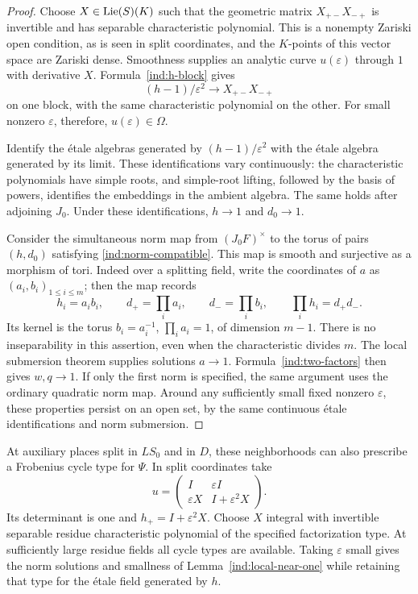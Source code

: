 \begin{proof}
Choose $X\in\operatorname{Lie}(S)(K)$ such that the geometric matrix
$X_{+-}X_{-+}$ is invertible and has separable characteristic polynomial.
This is a nonempty Zariski open condition, as is seen in split
coordinates, and the $K$-points of this vector space are Zariski dense.
Smoothness supplies an analytic curve $u(\varepsilon)$ through $1$ with
derivative $X$.  Formula~\eqref{ind:h-block} gives
\[
                    (h-1)/\varepsilon^2
                       \longrightarrow X_{+-}X_{-+}
\]
on one block, with the same characteristic polynomial on the other.
For small nonzero $\varepsilon$, therefore, $u(\varepsilon)\in\Omega$.

Identify the \'etale algebras generated by $(h-1)/\varepsilon^2$ with
the \'etale algebra generated by its limit.  These identifications vary
continuously: the characteristic polynomials have simple roots, and
simple-root lifting, followed by the basis of powers, identifies the
embeddings in the ambient algebra.  The same holds after adjoining
$J_0$.  Under these identifications, $h\to1$ and $d_0\to1$.

Consider the simultaneous norm map from $(J_0F)^\times$ to the torus of
pairs $(h,d_0)$ satisfying \eqref{ind:norm-compatible}.  This map is
smooth and surjective as a morphism of tori.  Indeed over a splitting
field, write the coordinates of $a$ as $(a_i,b_i)_{1\leq i\leq m}$;
then the map records
\[
           h_i=a_i b_i,\qquad d_+=\prod_i a_i,\qquad
           d_-=\prod_i b_i,\qquad \prod_i h_i=d_+d_-.
\]
Its kernel is the torus $b_i=a_i^{-1}$, $\prod_i a_i=1$, of dimension
$m-1$.  There is no inseparability in this assertion, even when the
characteristic divides $m$.  The local submersion theorem supplies
solutions $a\to1$.  Formula~\eqref{ind:two-factors} then gives $w,q\to1$.
If only the first norm is specified, the same argument uses the ordinary
quadratic norm map.  Around any sufficiently small fixed nonzero
$\varepsilon$, these properties persist on an open set, by the same
continuous \'etale identifications and norm submersion.
\end{proof}

At auxiliary places split in $LS_0$ and in $D$, these neighborhoods can
also prescribe a Frobenius cycle type for $\Psi$.  In split coordinates
take
\begin{equation}\label{ind:cycle-model}
 u=\begin{pmatrix}I&\varepsilon I\\
                  \varepsilon X&I+\varepsilon^2X\end{pmatrix}.
\end{equation}
Its determinant is one and $h_+=I+\varepsilon^2X$.  Choose $X$ integral
with invertible separable residue characteristic polynomial of the
specified factorization type.  At sufficiently large residue fields
all cycle types are available.  Taking $\varepsilon$ small gives the
norm solutions and smallness of Lemma~\ref{ind:local-near-one} while
retaining that type for the \'etale field generated by $h$.

